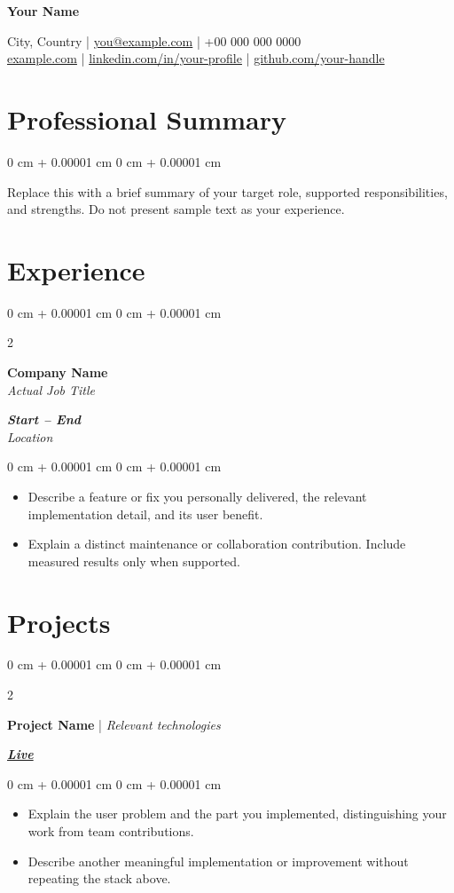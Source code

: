 \documentclass[10pt, letterpaper]{article}
\newenvironment{highlights}{
    \begin{itemize}[
        topsep=0.10 cm,
        parsep=0.10 cm,
        partopsep=0pt,
        itemsep=0pt,
        leftmargin=0.2 cm + 10pt
    ]
}{
    \end{itemize}
} %
\newenvironment{onecolentry}{
    \begin{adjustwidth}{
        0 cm + 0.00001 cm
    }{
        0 cm + 0.00001 cm
    }
}{
    \end{adjustwidth}
} %
\newenvironment{twocolentry}[2][]{
    \onecolentry
    \def\secondColumn{#2}
    \setcolumnwidth{\fill, 4.5 cm}
    \begin{paracol}{2}
}{
    \switchcolumn \raggedleft \secondColumn
    \end{paracol}
    \endonecolentry
} %
\newenvironment{header}{
    \setlength{\topsep}{0pt}\par\kern\topsep\centering\linespread{1.5}
}{
    \par\kern\topsep
} %
\begin{document}
\begin{header}
\fontsize{25 pt}{25 pt}\selectfont \textbf{Your Name}
\vspace{3 pt}
\normalsize

City, Country \;|\; \href{mailto:you@example.com}{you@example.com} \;|\; +00 000 000 0000\\
\href{https://example.com}{example.com} \;|\; \href{https://linkedin.com/in/your-profile}{linkedin.com/in/your-profile} \;|\; \href{https://github.com/your-handle}{github.com/your-handle}
\end{header}

\section{\textbf{Professional Summary}}
\begin{onecolentry}
Replace this with a brief summary of your target role, supported responsibilities, and strengths. Do not present sample text as your experience.
\end{onecolentry}

\section{\textbf{Experience}}
\begin{twocolentry}{\textbf{\textit{Start -- End}}\\\textit{Location}}
\textbf{Company Name}\\
\textit{Actual Job Title}
\end{twocolentry}
\vspace{0.10 cm}
\begin{onecolentry}
\begin{highlights}
\item Describe a feature or fix you personally delivered, the relevant implementation detail, and its user benefit.
\item Explain a distinct maintenance or collaboration contribution. Include measured results only when supported.
\end{highlights}
\end{onecolentry}

\section{\textbf{Projects}}
\begin{twocolentry}{\href{https://example.com}{\textit{\textbf{Live}}}}
\textbf{Project Name} \;|\; \textit{Relevant technologies}
\end{twocolentry}
\vspace{0.10 cm}
\begin{onecolentry}
\begin{highlights}
\item[-] Explain the user problem and the part you implemented, distinguishing your work from team contributions.
\item[-] Describe another meaningful implementation or improvement without repeating the stack above.
\end{highlights}
\end{onecolentry}
\end{document}
